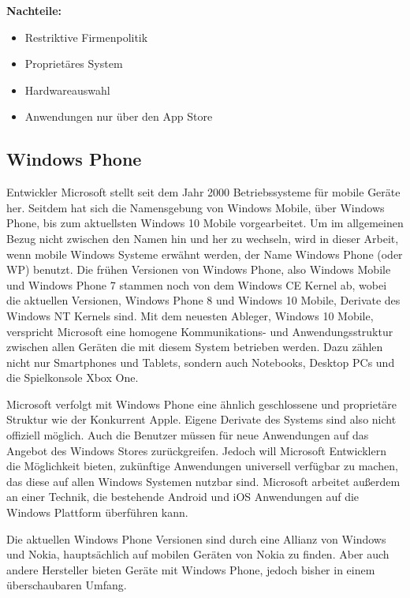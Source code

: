 \textbf{Nachteile:}
\begin{itemize}
	\item Restriktive Firmenpolitik
	\item Proprietäres System
	\item Hardwareauswahl
	\item Anwendungen nur über den App Store
\end{itemize}

\subsection{Windows Phone}
Entwickler Microsoft stellt seit dem Jahr 2000 Betriebssysteme für mobile Geräte her. \citep{microsoft_mobile} 
Seitdem hat sich die Namensgebung von Windows Mobile, über Windows Phone, bis zum aktuellsten Windows 10 Mobile vorgearbeitet. Um im allgemeinen Bezug nicht zwischen den Namen hin und her zu wechseln, wird in dieser Arbeit, wenn mobile Windows Systeme erwähnt werden, der Name Windows Phone (oder WP) benutzt.
Die frühen Versionen von Windows Phone, also Windows Mobile und Windows Phone 7 stammen noch von dem Windows CE Kernel ab, wobei die aktuellen Versionen, Windows Phone 8 und Windows 10 Mobile, Derivate des Windows NT Kernels sind. Mit dem neuesten Ableger, Windows 10 Mobile, verspricht Microsoft eine homogene Kommunikations- und Anwendungsstruktur zwischen allen Geräten die mit diesem System betrieben werden. Dazu zählen nicht nur Smartphones und Tablets, sondern auch Notebooks, Desktop PCs und die Spielkonsole Xbox One. \citep{windows10_features}

Microsoft verfolgt mit Windows Phone eine ähnlich geschlossene und proprietäre Struktur wie der Konkurrent Apple. Eigene Derivate des Systems sind also nicht offiziell möglich. Auch die Benutzer müssen für neue Anwendungen auf das Angebot des Windows Stores zurückgreifen. Jedoch will Microsoft Entwicklern die Möglichkeit bieten, zukünftige Anwendungen universell verfügbar zu machen, das diese auf allen Windows Systemen nutzbar sind. Microsoft arbeitet außerdem an einer Technik, die bestehende Android und iOS Anwendungen auf die Windows Plattform überführen kann. \citep{wp_with_android_ios}

Die aktuellen Windows Phone Versionen sind durch eine Allianz von Windows und Nokia, hauptsächlich auf mobilen Geräten von Nokia zu finden.\citep{microsoft_nokia}
Aber auch andere Hersteller bieten Geräte mit Windows Phone, jedoch bisher in einem überschaubaren Umfang.
\\

